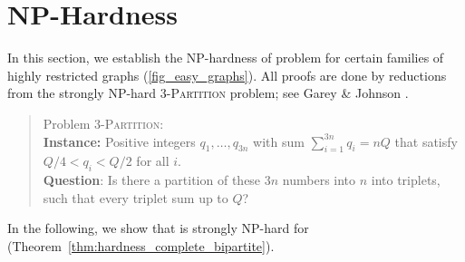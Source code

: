 \section{NP-Hardness}
\label{sec:hardness-chapter-6}
In this section, we establish the NP-hardness of problem {\xxxNTP} for certain families of
highly restricted graphs (\cref{fig_easy_graphs}). 
All proofs are done by reductions from the strongly NP-hard \textsc{3-Partition} problem;
see Garey \& Johnson \cite{garey1979computers}. 
\begin{quote}
Problem \textsc{3-Partition}: 
\\
\textbf{Instance:} Positive integers $q_1,\ldots,q_{3n}$ with sum $\sum_{i=1}^{3n}q_i=nQ$ that satisfy 
$Q/4<q_i<Q/2$ for all $i$.
\\
\textbf{Question}: Is there a partition of these $3n$ numbers into $n$ into triplets, such that  
every triplet sum up to $Q$?  
\end{quote}
In the following, we show that {\xxxNTP} is strongly NP-hard for  (Theorem~\ref{thm:hardness_complete_bipartite}). 
